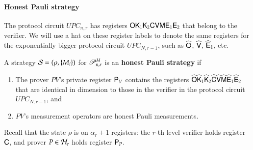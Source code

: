 \paragraph{Honest Pauli strategy} 
The protocol circuit $UPC_{n,r}$ has registers ${\mathsf{O}} {\mathsf{K}}_1 {\mathsf{K}}_2 {\mathsf{C}} {\mathsf{V}} {\mathsf{M}} {\mathsf{E}}_1 {\mathsf{E}}_2$ that belong to the verifier. We will use a hat on these register labels to denote the same registers for the exponentially bigger protocol circuit $UPC_{N,r-1}$, such as $\widehat{{\mathsf{O}}}$, $\widehat{{\mathsf{V}}}$, $\widehat{{\mathsf{E}}}_1$, etc.

A strategy $\mathcal{S} = (\rho,\{M_i\})$ for $\mathscr{P}_{n,r}^H$ is an \textbf{honest Pauli strategy} if
\begin{enumerate}
	\item The prover $PV$'s private register ${\mathsf{P}}_V$ contains the registers $\widehat{{\mathsf{O}}} \widehat{{\mathsf{K}}}_1 \widehat{{\mathsf{K}}}_2 \widehat{{\mathsf{C}}} \widehat{{\mathsf{V}}} \widehat{{\mathsf{M}}} \widehat{{\mathsf{E}}}_1 \widehat{{\mathsf{E}}}_2$ that are identical in dimension to those in the verifier in the protocol circuit $UPC_{N,r-1}$, and
	\item $PV$'s measurement operators are honest Pauli measurements.
\end{enumerate}
Recall that the state $\rho$ is on $\alpha_r + 1$ registers: the $r$-th level verifier holds register ${\mathsf{C}}$, and prover $P \in \mathcal H_r$ holds register ${\mathsf{P}}_P$.




